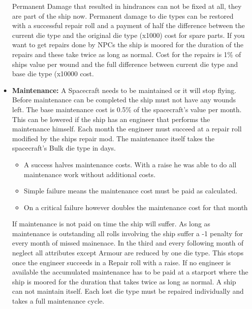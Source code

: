 \begin{multicols}{2}
\begin{itemize}
\begin{itemize}
  \end{itemize}
  Permanent Damage that resulted in hindrances can not be fixed at all, they are part of the ship now. Permanent damage to die types can be restored with a successful repair roll and a payment of half the difference between the current die type and the original die type (x1000) cost for spare parts. If you want to get repairs done by NPCs the ship is moored for the duration of the repairs and these take twice as long as normal. Cost for the repairs is 1\% of ships value per wound and the full difference between current die type and base die type (x10000 cost.
  \item \textbf{Maintenance:} A Spacecraft needs to be maintained or it will stop flying. Before maintenance can be completed the ship must not have any wounds left. The base maintenance cost is 0.5\% of the spacecraft's value per month. This can be lowered if the ship has an engineer that performs the maintenance himself. Each month the engineer must succeed at a repair roll modified by the ships repair mod. The maintenance itself takes the spacecraft's Bulk die type in days. 
  \begin{itemize}
    \item A success halves maintenance costs. With a raise he was able to do all maintenance work without additional costs.
    \item Simple failure means the maintenance cost must be paid as calculated.
    \item On a critical failure however doubles the maintenance cost for that month
  \end{itemize}
  If maintenance is not paid on time the ship will suffer. As long as maintenance is outstanding all rolls involving the ship suffer a -1
penalty for every month of missed mainenace. In the third and every following month of neglect all attributes except Armour are reduced by one die type. This stops once the engineer succeeds in a Repair roll with a raise. If no engineer is available the accumulated maintenance has to be paid at a starport where the ship is moored for the duration that takes twice as long as normal. A ship can not maintain itself. Each lost die type must be repaired individually and takes a full maintenance cycle.
\end{itemize}

\end{multicols}

